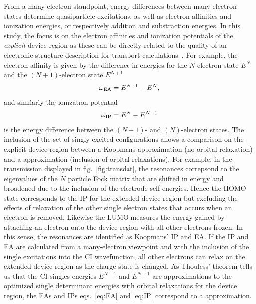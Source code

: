 From a many-electron standpoint, energy differences between many-electron
states determine quasiparticle excitations, as well as electron affinities
and ionization energies, or respectively addition and substraction energies. 
In this study, the focus is on the electron affinities and ionization
potentials of the {\it explicit} device region as these can be directly
related to the quality of an electronic structure description for transport
calculations~\cite{golden}. For example, the electron affinity is given
by the difference in energies for the $N$-electron state $E^N$ and the
$(N+1)$-electron state $E^{N+1}$
\numparts
\begin{equation}
\label{eq:EA}
\omega_{\rm EA} = E^{N+1} -E^N,
\end{equation}
and similarly the ionization potential
\begin{equation}
\label{eq:IP}
\omega_{\rm IP} =  E^N - E^{N-1}
\end{equation}
\endnumparts
is the energy difference between the $(N-1)$- and $(N)$-electron states.
The inclusion of the set of singly excited configurations allows a
comparison on the explicit device region between a Koopmans approximation 
(no orbital relaxation) and a \dscf approximation (inclusion of
orbital relaxations).  For example, in the transmission displayed in
fig.~\ref{fig:transdat}, the resonances correpsond to the eigenvalues of
the $N$ particle Fock matrix that are shifted in energy and broadened due
to the inclusion of the electrode self-energies. Hence the \ac{HOMO} state
corresponds to the IP for the extended device region but excluding the
effects of relaxation of the other single electron states that occurs
when an electron is removed. Likewise the LUMO measures the energy gained
by attaching an electron onto the device region with all other electrons
frozen. In this sense, the resonances are identified as Koopmans' IP and
EA. If the IP and EA are calculated from a many-electron viewpoint and
with the inclusion of the single excitations into the CI wavefunction,
all other electrons can relax on the extended device region as the charge
state is changed. As Thouless' theorem tells us that the CI singles
energies $E^{N-1}$ and $E^{N+1}$ are approximations to the optimized
single determinant energies with orbital relaxations for the device region,
the EAs and IPs eqs.~\ref{eq:EA} and \ref{eq:IP} correspond to a \dscf
approximation. 

